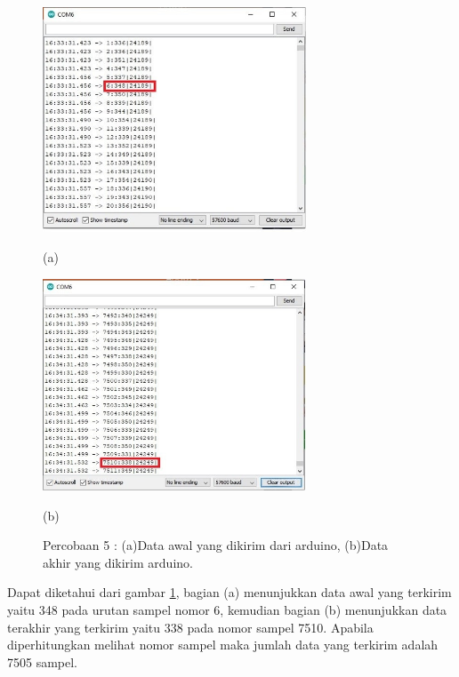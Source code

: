\begin{figure}[H] \centering
	\includegraphics[width=0.7\textwidth]{img/percob/Slide9}
	
	(a)
	
	\includegraphics[width=0.7\textwidth]{img/percob/Slide10}
	
	(b)
	
	\caption{Percobaan 5 : (a)Data awal yang dikirim dari arduino, (b)Data akhir yang dikirim arduino.}
	\label{fig:4.2.7}
\end{figure}
\vspace{1ex}
Dapat diketahui dari gambar \ref{fig:4.2.7}, bagian (a) menunjukkan data awal yang terkirim yaitu 348 pada urutan sampel nomor 6, kemudian bagian (b) menunjukkan data terakhir yang terkirim yaitu 338 pada nomor sampel 7510. Apabila diperhitungkan melihat nomor sampel maka jumlah data yang terkirim adalah 7505 sampel.
